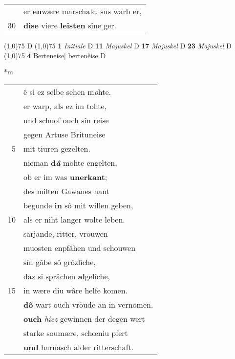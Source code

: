 \documentclass[8pt,a4paper,notitlepage]{article}
\begin{document}
\begin{table}[ht]
\begin{minipage}[t]{0.5\linewidth}
\begin{tabular}{rl}
 & er \textbf{en}wære marschalc. sus warb er,\\ 
30 & \textbf{dise} viere \textbf{leisten} sîne ger.\\ 
\end{tabular}
\scriptsize
\line(1,0){75} \newline
D \newline
\line(1,0){75} \newline
\textbf{1} \textit{Initiale} D  \textbf{11} \textit{Majuskel} D  \textbf{17} \textit{Majuskel} D  \textbf{23} \textit{Majuskel} D  \newline
\line(1,0){75} \newline
\textbf{4} Berteneise] bertenêise D \newline
\end{minipage}
\hspace{0.5cm}
\begin{minipage}[t]{0.5\linewidth}
\small
\begin{center}*m
\end{center}
\begin{tabular}{rl}
 & ê si ez selbe sehen m\textit{o}hte.\\ 
 & er warp, als ez im tohte,\\ 
 & und schuof ouch sîn reise\\ 
 & gegen Artuse Brituneise\\ 
5 & mit tiuren gezelten.\\ 
 & nieman \textbf{d\textit{â}} mohte engelten,\\ 
 & ob er im was \textbf{unerkant};\\ 
 & des milten Gawanes hant\\ 
 & begunde \textbf{in} sô mit willen geben,\\ 
10 & als er niht langer wolte leben.\\ 
 & sarjande, ritter, vrouwen\\ 
 & muosten enpfâhen und schouwen\\ 
 & sîn gâbe sô grôzlîche,\\ 
 & daz si sprâchen \textbf{al}gelîche,\\ 
15 & in wære diu wâre helfe komen.\\ 
 & \textbf{dô} wart ouch vröude an in vernomen.\\ 
 & \textbf{ouch} \textit{hiez} gewinnen der degen wert\\ 
 & starke soumære, schœniu pfert\\ 
 & \textbf{und} harnasch alder ritterschaft.\\ 

\end{tabular}
\end{minipage}
\end{table}
\end{document}
